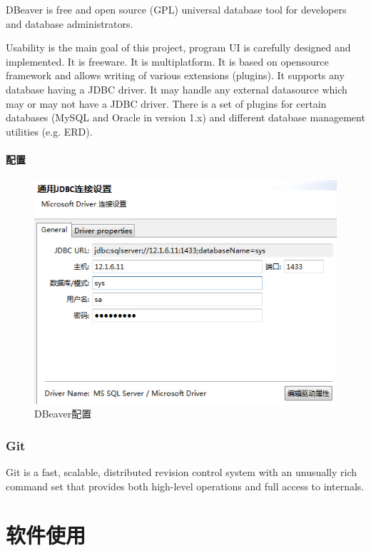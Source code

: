 \documentclass[paper=a4,fontsize=11pt]{article}
\begin{document}
	DBeaver is free and open source (GPL) universal database tool for developers and database administrators.
	
	Usability is the main goal of this project, program UI is carefully designed and implemented.
	It is freeware.
	It is multiplatform.
	It is based on opensource framework and allows writing of various extensions (plugins).
	It supports any database having a JDBC driver.
	It may handle any external datasource which may or may not have a JDBC driver.
	There is a set of plugins for certain databases (MySQL and Oracle in version 1.x) and different database management utilities (e.g. ERD).
	
	\subsection{配置}
	
	\begin{figure}[htbp]
		\centering
		\includegraphics[scale=0.8]{JDBCConnectionConfig.jpg}
		\caption{DBeaver配置}
		\label{JDBCConnectionConfig}
	\end{figure}
	
	\section{Git}
	Git is a fast, scalable, distributed revision control system with an unusually rich command set that provides both high-level operations and full access to internals.
	
	
	\clearpage
	\part{软件使用}
	\clearpage
\end{document}

